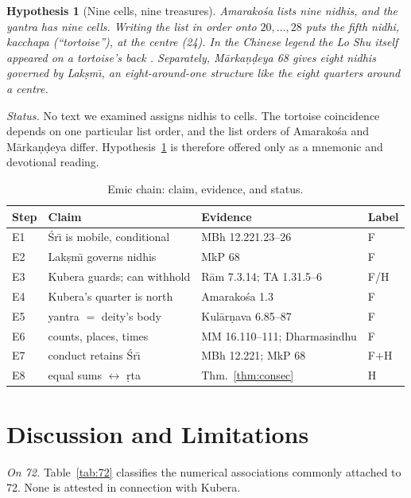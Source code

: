 \documentclass[pdflatex,sn-basic]{sn-jnl}
\theoremstyle{thmstyleone}
\theoremstyle{thmstylethree}
\newtheorem{hypothesis}{Hypothesis}
\begin{document}
\begin{hypothesis}[Nine cells, nine treasures]\label{hyp:nidhi}
Amarako\'sa lists nine nidhis, and the yantra has nine cells. Writing the list in order onto $20,\dots,28$ puts the fifth nidhi, \emph{kacchapa} (``tortoise''), at the centre (24). In the Chinese legend the Lo Shu itself appeared on a tortoise's back \citep{wiki_luoshu}. Separately, M\=arka\d n\d deya 68 gives \emph{eight} nidhis governed by Lak\d sm\=\i{}, an eight-around-one structure like the eight quarters around a centre.
\end{hypothesis}
\noindent \emph{Status.} No text we examined assigns nidhis to cells. The tortoise coincidence depends on one particular list order, and the list orders of Amarako\'sa and M\=arka\d n\d deya differ. Hypothesis~\ref{hyp:nidhi} is therefore offered only as a mnemonic and devotional reading.

\begin{table}[t]
\caption{Emic chain: claim, evidence, and status.}
\label{tab:chain}
\centering\footnotesize
\setlength{\tabcolsep}{2pt}
\begin{tabular}{@{}p{}p{}p{}p{}@{}}
\toprule
Step & Claim & Evidence & Label\\
\midrule
E1 & \'Sr\=\i{} is mobile, conditional & MBh 12.221.23--26 & F\\
E2 & Lak\d sm\=\i{} governs nidhis & MkP 68 & F\\
E3 & Kubera guards; can withhold & R\=am 7.3.14; TA 1.31.5--6 & F/H\\
E4 & Kubera's quarter is north & Amarako\'sa 1.3 & F\\
E5 & yantra $=$ deity's body & Kul\=ar\d nava 6.85--87 & F\\
E6 & counts, places, times & MM 16.110--111; Dharmasindhu & F\\
E7 & conduct retains \'Sr\=\i & MBh 12.221; MkP 68 & F$+$H\\
E8 & equal sums $\leftrightarrow$ \d rta & Thm.~\ref{thm:consec} & H\\
\bottomrule
\end{tabular}
\end{table}

\section{Discussion and Limitations}
\label{sec:disc}
\emph{On 72.} Table~\ref{tab:72} classifies the numerical associations commonly attached to 72. None is attested in connection with Kubera.
\end{document}

